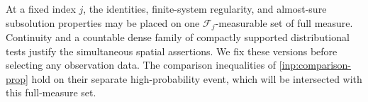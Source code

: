 At a fixed index $j$, the identities, finite-system regularity, and
almost-sure subsolution properties may be placed on one
$\mathcal F_j$-measurable set of full measure.  Continuity and a countable
dense family of compactly supported distributional tests justify the
simultaneous spatial assertions.  We fix these versions before selecting
any observation data.  The comparison inequalities of
\cref{inp:comparison-prop} hold on their separate high-probability event,
which will be intersected with this full-measure set.

